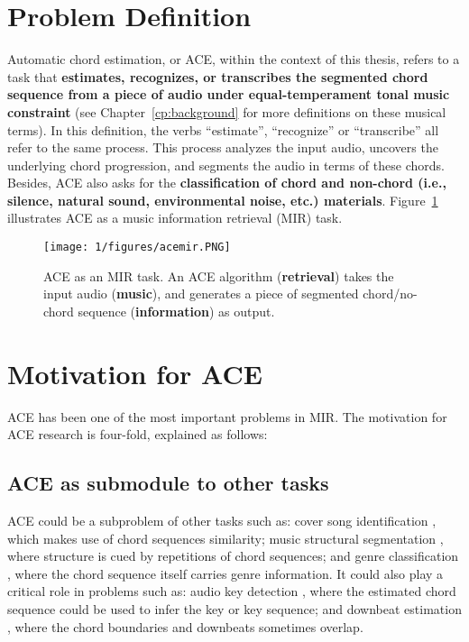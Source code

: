 \section{Problem Definition} \label{sec:1-problemdef}
Automatic chord estimation, or ACE, within the context of this thesis, refers to a task that \textbf{estimates, recognizes, or transcribes the segmented chord sequence from a piece of audio under equal-temperament tonal music constraint} (see Chapter~\ref{cp:background} for more definitions on these musical terms). In this definition, the verbs ``estimate'', ``recognize'' or ``transcribe'' all refer to the same process. This process analyzes the input audio, uncovers the underlying chord progression, and segments the audio in terms of these chords. Besides, ACE also asks for the \textbf{classification of chord and non-chord (i.e., silence, natural sound, environmental noise, etc.) materials}. Figure~\ref{fig:1-acemir} illustrates ACE as a music information retrieval (MIR) task.
\begin{figure}[h]
\centering
\texttt{[image: 1/figures/acemir.PNG]}
\caption{ACE as an MIR task. An ACE algorithm (\textbf{retrieval}) takes the input audio (\textbf{music}), and generates a piece of segmented chord/no-chord sequence (\textbf{information}) as output.}
\label{fig:1-acemir}
\end{figure}

\section{Motivation for ACE} \label{sec:1-moti}
ACE has been one of the most important problems in MIR. The motivation for ACE research is four-fold, explained as follows:

\subsection{ACE as submodule to other tasks}
ACE could be a subproblem of other tasks such as: cover song identification \cite{bello2007audio,lee2006identifying,serra2010audio}, which makes use of chord sequences similarity; music structural segmentation \cite{bello2005robust}, where structure is cued by repetitions of chord sequences; and genre classification \cite{cheng2008automatic,perez2009genre}, where the chord sequence itself carries genre information. It could also play a critical role in problems such as: audio key detection \cite{papadopoulos2012modeling,pauwels2010integrating}, where the estimated chord sequence could be used to infer the key or key sequence;  and downbeat estimation \cite{papadopoulos2008simultaneous,mauch2010simultaneous}, where the chord boundaries and downbeats sometimes overlap.

